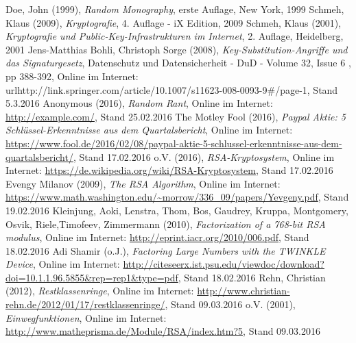 \documentclass[a4paper, fontsize=12pt, parskip=full, toc=bibliographynumbered]{scrreprt}
\begin{document}
\renewcommand{\bibname}{Quellenverzeichnis}
\begin{thebibliography}{9}
 Doe, John (1999), \emph{Random Monography}, erste
  Auflage, New York, 1999
 Schmeh, Klaus (2009), \emph{Kryptografie}, 4. Auflage - iX Edition, 2009
 Schmeh, Klaus (2001), \emph{Kryptografie und Public-Key-Infrastrukturen im Internet}, 2. Auflage, Heidelberg, 2001
 Jens-Matthias Bohli, Christoph Sorge (2008), \emph{Key-Substitution-Angriffe und das Signaturgesetz}, Datenschutz und Datensicherheit - DuD - Volume 32, Issue 6 , pp 388-392, Online im Internet: url{http://link.springer.com/article/10.1007/s11623-008-0093-9\#/page-1}, Stand 5.3.2016
 Anonymous (2016), \emph{Random Rant}, Online im
  Internet: \url{http://example.com/}, Stand 25.02.2016
 The Motley Fool (2016), \emph{Paypal Aktie: 5 Schlüssel-Erkenntnisse aus dem Quartalsbericht}, Online im
  Internet: \url{https://www.fool.de/2016/02/08/paypal-aktie-5-schlussel-erkenntnisse-aus-dem-quartalsbericht/}, Stand 17.02.2016
 o.V. (2016), \emph{RSA-Kryptosystem}, Online im
  Internet: \url{https://de.wikipedia.org/wiki/RSA-Kryptosystem}, Stand 17.02.2016
 Evengy Milanov (2009), \emph{The RSA Algorithm}, Online im
  Internet: \url{https://www.math.washington.edu/~morrow/336_09/papers/Yevgeny.pdf}, Stand 19.02.2016
 Kleinjung, Aoki, Lenstra, Thom, Bos, Gaudrey, Kruppa, Montgomery, Osvik, Riele,Timofeev, Zimmermann (2010), \emph{Factorization of a 768-bit RSA modulus}, Online im
  Internet: \url{http://eprint.iacr.org/2010/006.pdf}, Stand 18.02.2016
 Adi Shamir (o.J.), \emph{Factoring Large Numbers with the TWINKLE Device}, Online im
  Internet: \url{http://citeseerx.ist.psu.edu/viewdoc/download?doi=10.1.1.96.5855&rep=rep1&type=pdf}, Stand 18.02.2016
 Rehn, Christian (2012), \emph{Restklassenringe}, Online im
  Internet: \url{http://www.christian-rehn.de/2012/01/17/restklassenringe/}, Stand 09.03.2016
 o.V. (2001), \emph{Einwegfunktionen}, Online im Internet: \url{http://www.matheprisma.de/Module/RSA/index.htm?5}, Stand 09.03.2016

\end{thebibliography}
\end{document}
